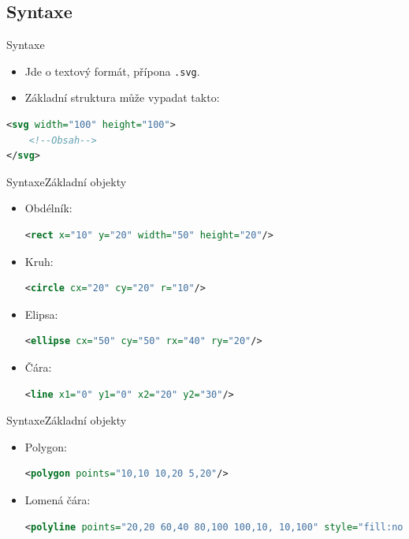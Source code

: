 \subsection{Syntaxe}
\begin{frame}[t,fragile]{Syntaxe}
    \begin{itemize}
        \item Jde o textový formát, přípona \texttt{.svg}.
        \item Základní struktura může vypadat takto:
    \end{itemize}
    \begin{lstlisting}[language=XML]
<svg width="100" height="100">
    <!--Obsah-->
</svg>
    \end{lstlisting}
\end{frame}

\begin{frame}[t,fragile]{Syntaxe}{Základní objekty}
    \begin{itemize}
        \item Obdélník:
        \begin{lstlisting}[language=XML]
<rect x="10" y="20" width="50" height="20"/>
        \end{lstlisting}
        \item Kruh:
        \begin{lstlisting}[language=XML]
<circle cx="20" cy="20" r="10"/>
        \end{lstlisting}
        \item Elipsa:
        \begin{lstlisting}[language=XML]
<ellipse cx="50" cy="50" rx="40" ry="20"/>
        \end{lstlisting}
        \item Čára:
        \begin{lstlisting}[language=XML]
<line x1="0" y1="0" x2="20" y2="30"/>
        \end{lstlisting}
    \end{itemize}
\end{frame}

\begin{frame}[t,fragile]{Syntaxe}{Základní objekty}
    \begin{itemize}
        \item Polygon:
        \begin{lstlisting}[language=XML]
<polygon points="10,10 10,20 5,20"/>
        \end{lstlisting}
        \item Lomená čára:
        \begin{lstlisting}[language=XML]
<polyline points="20,20 60,40 80,100 100,10, 10,100" style="fill:none"/>
        \end{lstlisting}
    \end{itemize}
\end{frame}

